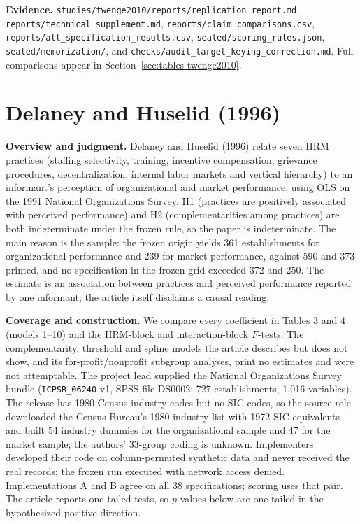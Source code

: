 \documentclass[11pt]{article}
\newcommand{\artifact}[1]{\nolinkurl{#1}}
\begin{document}
\textbf{Evidence.} \artifact{studies/twenge2010/reports/replication_report.md}, \artifact{reports/technical_supplement.md}, \artifact{reports/claim_comparisons.csv}, \artifact{reports/all_specification_results.csv}, \artifact{sealed/scoring_rules.json}, \artifact{sealed/memorization/}, and \artifact{checks/audit_target_keying_correction.md}. Full comparisons appear in Section~\ref{sec:tables-twenge2010}.

\clearpage
\section{Delaney and Huselid (1996)}\label{sec:delaney}
\textbf{Overview and judgment.} Delaney and Huselid (1996) relate seven HRM practices (staffing selectivity, training, incentive compensation, grievance procedures, decentralization, internal labor markets and vertical hierarchy) to an informant's perception of organizational and market performance, using OLS on the 1991 National Organizations Survey. H1 (practices are positively associated with perceived performance) and H2 (complementarities among practices) are both indeterminate under the frozen rule, so the paper is indeterminate. The main reason is the sample: the frozen origin yields 361 establishments for organizational performance and 239 for market performance, against 590 and 373 printed, and no specification in the frozen grid exceeded 372 and 250. The estimate is an association between practices and perceived performance reported by one informant; the article itself disclaims a causal reading.

\textbf{Coverage and construction.} We compare every coefficient in Tables 3 and 4 (models 1--10) and the HRM-block and interaction-block $F$-tests. The complementarity, threshold and spline models the article describes but does not show, and its for-profit/nonprofit subgroup analyses, print no estimates and were not attemptable. The project lead supplied the National Organizations Survey bundle (\texttt{ICPSR\_06240} v1, SPSS file DS0002: 727 establishments, 1,016 variables). The release has 1980 Census industry codes but no SIC codes, so the source role downloaded the Census Bureau's 1980 industry list with 1972 SIC equivalents and built 54 industry dummies for the organizational sample and 47 for the market sample; the authors' 33-group coding is unknown. Implementers developed their code on column-permuted synthetic data and never received the real records; the frozen run executed with network access denied. Implementations A and B agree on all 38 specifications; scoring uses that pair. The article reports one-tailed tests, so $p$-values below are one-tailed in the hypothesized positive direction.
\end{document}
